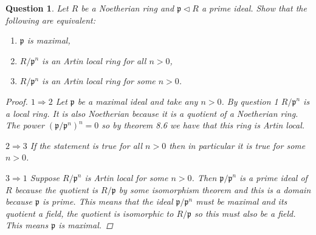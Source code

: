 \documentclass{article}
\newcommand{\primeid}{\mathfrak{p}}
\newcommand{\ideal}{\triangleleft}
\newtheorem{question}{Question}
\theoremstyle{definition}
\begin{document}
\begin{question}
    Let \(R\) be a Noetherian ring and \(\primeid\ideal R\) a prime ideal. Show
    that the following are equivalent:
    \begin{enumerate}
        \item \(\primeid\) is maximal,
        \item \(R/\primeid^{n}\) is an Artin local ring for all \(n>0\),
        \item \(R/\primeid^{n}\) is an Artin local ring for some \(n>0\).
    \end{enumerate}

    \begin{proof}
        \(1\Rightarrow2\) Let \(\primeid\) be a maximal ideal and take any
        \(n>0\). By question 1 \(R/\primeid^{n}\) is a local ring. It is also
        Noetherian because it is a quotient of a Noetherian ring. The power
        \((\primeid/\primeid^{n})^{n}=0\) so by theorem 8.6 we have that this
        ring is Artin local.

        \(2\Rightarrow3\) If the statement is true for all \(n>0\) then in
        particular it is true for some \(n>0\).

        \(3\Rightarrow1\) Suppose \(R/\primeid^{n}\) is Artin local for some
        \(n>0\). Then \(\primeid/\primeid^{n}\) is a prime ideal of \(R\)
        because the quotient is \(R/\primeid\) by some isomorphism theorem and
        this is a domain because \(\primeid\) is prime. This means that the
        ideal \(\primeid/\primeid^{n}\) must be maximal and its quotient a
        field, the quotient is isomorphic to \(R/\primeid\) so this must also be
        a field. This means \(\primeid\) is maximal.
    \end{proof}
\end{question}
\end{document}
